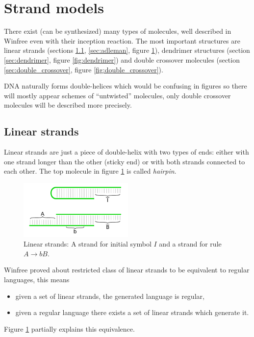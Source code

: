 
\section{Strand models}
	
	There exist (can be synthesized) many types of molecules, well described in Winfree \cite{winfree_phd} even with their inception reaction. The most important structures are linear strands (sections \ref{sec:lin_strands}, \ref{sec:adleman}, figure \ref{fig:linear}), dendrimer structures (section \ref{sec:dendrimer}, figure \ref{fig:dendrimer}) and double crossover molecules (section \ref{sec:double_crossover}, figure \ref{fig:double_crossover}).
	\begin{note}\label{note:untwist}
		DNA naturally forms double-helices which would be confusing in figures so there will mostly appear schemes of ``untwisted'' molecules, only double crossover molecules will be described more precisely. %
	\end{note}
	
	\subsection{Linear strands}
	\label{sec:lin_strands}
		
		Linear strands are just a piece of double-helix with two types of ends: either with one strand longer than the other (sticky end) or with both strands connected to each other. The top molecule in figure \ref{fig:linear} is called {\em hairpin}.
		\begin{figure}[H]
		\begin{center}
			\includegraphics[width=0.502\textwidth]{./figures/strand_types/linear.pdf} %
			\caption{Linear strands: A strand for initial symbol $I$ and a strand for rule $A\rightarrow bB$.}
			\label{fig:linear}
		\end{center}
		\end{figure}
		Winfree \cite{winfree_phd} proved about restricted class of linear strands to be equivalent to regular languages, this means
		\begin{itemize}
			\item given a set of linear strands, the generated language is regular,
			\item given a regular language there exists a set of linear strands which generate it.
		\end{itemize}
		Figure \ref{fig:linear} partially explains this equivalence.
	
